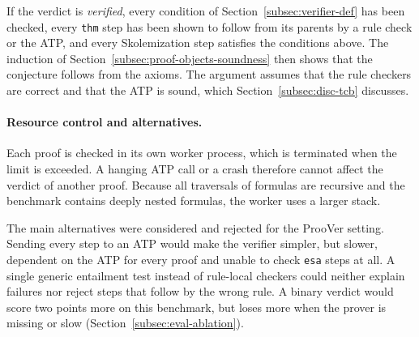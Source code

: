 If the verdict is \emph{verified}, every condition of Section~\ref{subsec:verifier-def} has been checked, every \texttt{thm} step has been shown to follow from its parents by a rule check or the ATP, and every Skolemization step satisfies the conditions above.
The induction of Section~\ref{subsec:proof-objects-soundness} then shows that the conjecture follows from the axioms.
The argument assumes that the rule checkers are correct and that the ATP is sound, which Section~\ref{subsec:disc-tcb} discusses.

\paragraph{Resource control and alternatives.}
\label{subsec:design-resources}
\label{subsec:design-alternatives}

Each proof is checked in its own worker process, which is terminated when the limit is exceeded. A hanging ATP call or a crash therefore cannot affect the verdict of another proof.
Because all traversals of formulas are recursive and the benchmark contains deeply nested formulas, the worker uses a larger stack.

The main alternatives were considered and rejected for the ProoVer setting.
Sending every step to an ATP would make the verifier simpler, but slower, dependent on the ATP for every proof and unable to check \texttt{esa} steps at all.
A single generic entailment test instead of rule-local checkers could neither explain failures nor reject steps that follow by the wrong rule.
A binary verdict would score two points more on this benchmark, but loses more when the prover is missing or slow (Section~\ref{subsec:eval-ablation}).
